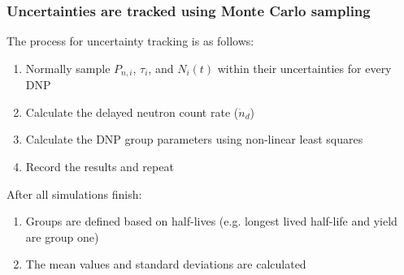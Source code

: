 \begin{frame}
  \frametitle{Uncertainties are tracked using Monte Carlo sampling}
  \begin{block}{The process for uncertainty tracking is as follows:}
    \begin{enumerate}
        \item Normally sample $P_{n,i}$, $\tau_i$, and $N_i(t)$ within their uncertainties for every \gls{DNP}
	\item Calculate the delayed neutron count rate ($\dot{n}_d$)
        \item Calculate the \gls{DNP} group parameters using non-linear least squares
        \item Record the results and repeat
    \end{enumerate}
  \end{block}

  \begin{block}{After all simulations finish:}
    \begin{enumerate}
        \item Groups are defined based on half-lives (e.g. longest lived half-life and yield are group one)
        \item The mean values and standard deviations are calculated
    \end{enumerate}
  \end{block}

\end{frame}

